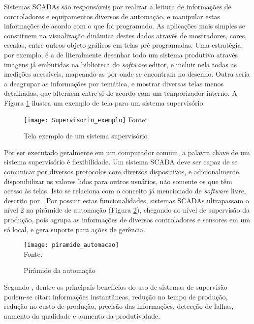 Sistemas SCADAs são responsáveis por realizar a leitura de informações de controladores e equipamentos diversos de automação, e manipular estas informações de acordo com o que foi programado. As aplicações mais simples se constituem na visualização dinâmica destes dados através de mostradores, cores, escalas, entre outros objeto gráficos em telas pré programadas. Uma estratégia, por exemplo, é a de literalmente desenhar todo um sistema produtivo através imagens já embutidas na biblioteca do \textit{software} editor, e incluir nela todas as medições acessíveis, mapeando-as por onde se encontram no desenho. Outra seria a deagrupar as informações por temática, e mostrar diversas telas menos detalhadas, que alternem entre si de acordo com um temporizador interno. A Figura \ref{img_supervisorio_exemplo} ilustra um exemplo de tela para um sistema supervisório.

\begin{figure}[hbt]
	\centering
	\caption{Tela exemplo de um sistema supervisório}
	\texttt{[image: Supervisorio\_exemplo]}
	Fonte: 
	\label{img_supervisorio_exemplo}
\end{figure}

Por ser executado geralmente em um computador comum, a palavra chave de um sistema supervisório é flexibilidade. Um sistema SCADA deve ser capaz de se comunicar por diversos protocolos com diversos dispositivos, e adicionalmente disponibilizar os valores lidos para outros usuários, não somente os que têm acesso às telas. Isto se relaciona com o conceito já mencionado de \textit{software} livre, descrito por . Por possuir estas funcionalidades, sistemas SCADAs ultrapassam o nível 2 na pirâmide de automação (Figura \ref{img_piramide_automacao}), chegando ao nível de supervisão da produção, pois agrupa as informações de diversos controladores e sensores em um só local, e gera suporte para ações de gerência.

\begin{figure}[hbt]
	\centering
	\caption{Pirâmide da automação}
	\texttt{[image: piramide\_automacao]} \\
	Fonte: 
	\label{img_piramide_automacao}
\end{figure}

Segundo , dentre os principais benefícios do uso de sistemas de supervisão podem-se citar: informações instantâneas, redução no tempo de produção, redução no custo de produção, precisão das informações, detecção de falhas, aumento da qualidade e aumento da produtividade.

